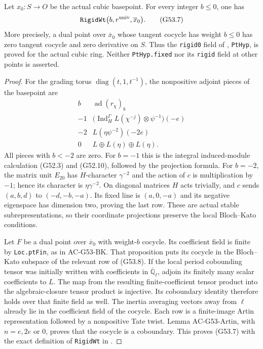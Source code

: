\begin{theorem}
\label{AC-G53}
Let $x_0:S\to O$ be the actual cubic basepoint.
For every integer $b\leq0$, one has
\[
 \texttt{RigidWt}\bigl(b,r^{\rm univ},\overline{x}_0\bigr).
                                                               \tag{G53.7}
\]
More precisely, a dual point over $\overline{x}_0$ whose
tangent cocycle has weight $b\leq0$ has zero tangent
cocycle and zero derivative on $S$.
Thus the \texttt{rigid0} field of
, \texttt{PtHyp},
is proved for the actual cubic ring.
Neither \texttt{PtHyp.fixed} nor its \texttt{rigid}
field at other points is asserted.
\end{theorem}
\begin{proof}
For the grading torus $\operatorname{diag}(t,1,t^{-1})$,
the nonpositive adjoint pieces of the basepoint are
\[
 \begin{array}{c|c}
 b&\operatorname{ad}(r_\chi)_b\\ \hline
 -1&
 \bigl(\operatorname{Ind}_{H}^{\Gamma}L(\chi^{-j})
                                      \otimes\psi^{-1}\bigr)(-e)\\
 -2&L(\eta\psi^{-2})(-2e)\\
 0&L\oplus L(\eta)\oplus L(\eta).
 \end{array}                                                   \tag{G53.8}
\]
All pieces with $b<-2$ are zero.
For $b=-1$ this is the integral induced-module
calculation (G52.3) and (G52.10), followed by the
projection formula.  For $b=-2$, the matrix unit
$E_{20}$ has $H$-character $\gamma^{-2}$ and the
action of $c$ is multiplication by $-1$; hence its
character is $\eta\gamma^{-2}$.
On diagonal matrices $H$ acts trivially, and
$c$ sends $(a,b,d)$ to $(-d,-b,-a)$.
Its fixed line is $(a,0,-a)$ and its negative
eigenspace has dimension two, proving the last row.
These are actual stable subrepresentations, so their
coordinate projections preserve the local
Bloch--Kato conditions.

Let $F$ be a dual point over $\overline{x}_0$ with
weight-$b$ cocycle.  Its coefficient field is finite
by \texttt{Loc.ptFin}, as in AC-G53-BK.
That proposition puts its cocycle in the Bloch--Kato
subspace of the relevant row of (G53.8).
If the local period cobounding tensor was initially
written with coefficients in $\overline{\mathbb Q}_\ell$,
adjoin its finitely many scalar coefficients to $L$.
The map from the resulting finite-coefficient tensor
product into the algebraic-closure tensor product is
injective.  Its coboundary identity therefore holds
over that finite field as well.  The inertia
averaging vectors away from $\ell$ already lie in
the coefficient field of the cocycle.
Each row is a finite-image Artin representation
followed by a nonpositive Tate twist.  Lemma
AC-G53-Artin, with $n=e,2e$ or $0$, proves that the
cocycle is a coboundary.  This proves (G53.7) with
the exact definition of \texttt{RigidWt} in
.


\end{proof}
